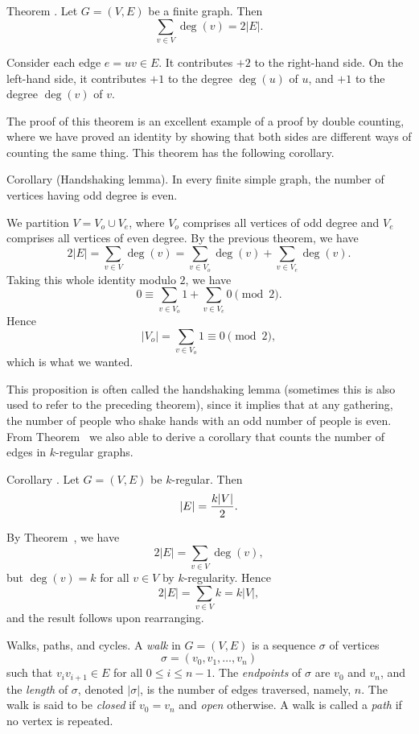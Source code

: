 \edef\thmdegformula{\the\thmcount}
\proclaim Theorem \advthm. Let $G = (V,E)$ be a finite graph. Then
$$\sum_{v\in V} \deg(v) = 2|E|.$$

\proof Consider each edge $e = uv \in E$. It contributes $+2$ to the right-hand side.
On the left-hand side, it contributes $+1$ to the degree $\deg(u)$ of $u$,
and $+1$ to the degree $\deg(v)$ of $v$.\slug

The proof of this theorem is an excellent example of a proof by double counting, where
we have proved an identity by showing that both sides are different ways
of counting the same thing. This theorem has the following corollary.

\parenproclaim Corollary {\advthm} (Handshaking lemma).
In every finite simple graph, the number of vertices having odd degree is even.

\proof We partition $V = V_o \cup V_e$, where $V_o$ comprises all vertices of
odd degree and $V_e$ comprises all vertices of even degree. By the previous theorem,
we have
$$2|E| = \sum_{v\in V} \deg (v) = \sum_{v\in V_o} \deg(v) + \sum_{v\in V_e} \deg(v).$$
Taking this whole identity modulo $2$, we have
$$0 \equiv \sum_{v\in V_o} 1 + \sum_{v\in V_e} 0\pmod 2.$$
Hence
$$|V_o| = \sum_{v\in V_o} 1 \equiv 0\pmod 2,$$
which is what we wanted.\slug

This proposition is often called the handshaking lemma (sometimes this is also used
to refer to the preceding theorem),
since it implies that at any gathering, the number of people who shake hands with
an odd number of people is even. From Theorem~{\thmdegformula} we also able to derive
a corollary that counts the number of edges in $k$-regular graphs.

\proclaim Corollary \advthm. Let $G = (V,E)$ be $k$-regular. Then
$$|E| = {k|V|\over 2}.$$

\proof By Theorem~{\thmdegformula}, we have
$$2|E| = \sum_{v\in V}\deg (v),$$
but $\deg(v) = k$ for all $v\in V$ by $k$-regularity. Hence
$$2|E| = \sum_{v\in V} k = k|V|,$$
and the result follows upon rearranging.\slug

\medskip\boldlabel Walks, paths, and cycles.
A {\it walk} in $G = (V,E)$ is a sequence $\sigma$ of vertices
$$\sigma = (v_0, v_1, \ldots, v_n)$$
such that $v_i v_{i+1}\in E$ for all $0\le i \le n-1$. The {\it endpoints}
of $\sigma$ are $v_0$ and $v_n$, and the {\it length} of $\sigma$, denoted $|\sigma|$,
is the number of edges traversed, namely, $n$.
The walk is said to be {\it closed} if $v_0 = v_n$ and {\it open} otherwise.
A walk is called a {\it path} if no vertex is repeated.

